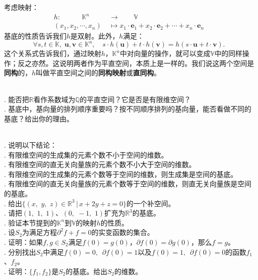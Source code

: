 \documentclass[12pt,UTF8]{ctexbook}
\begin{document}
考虑映射：
\begin{align*}
    h:\quad \qquad \mathbb{K}^n\qquad &\rightarrow \qquad \mathbb{V} \\
    (x_1, x_2, \cdots , x_n) &\mapsto x_1\cdot \mathbf{e}_1 + x_2\cdot \mathbf{e}_2 + \cdots + x_n\cdot \mathbf{e}_n
\end{align*}
基底的性质告诉我们$h$是双射。此外，$h$满足：
$$ \forall s, t \in \mathbb{K}, \; \mathbf{u}, \mathbf{v}\in \mathbb{K}^n, \quad s\cdot h(\mathbf{u}) + t\cdot h(\mathbf{v}) = h(s\cdot \mathbf{u} + t\cdot \mathbf{v}). $$
这个关系式告诉我们，通过映射$h$，$\mathbb{K}^n$中对向量的操作，就可以变成$\mathbb{V}$中的同样操作；反之亦然。这说明两者作为平直空间，本质上是一样的。我们说这两个空间是\textbf{同构}的，$h$叫做平直空间之间的\textbf{同构映射}或\textbf{直同构}。

\begin{sk}
    \mbox{} \\
    . 能否把$\mathbb{R}$看作系数域为$\mathbb{Q}$的平直空间？它是否是有限维空间？\\
    . 基底中，基向量的排列顺序重要吗？按不同顺序排列的基向量，能否看做不同的基底？给出你的理由。
\end{sk}

\begin{xt}
    \mbox{} \\
    . 说明以下结论：\\
    . 有限维空间的生成集的元素个数不小于空间的维数。\\
    . 有限维空间的直无关向量族的元素个数不小大于空间的维数。\\
    . 有限维空间的生成集的元素个数等于空间的维数，则生成集是空间的基底。\\
    . 有限维空间的直无关向量族的元素个数等于空间的维数，则直无关向量族是空间的基底。\\
    . 给出$\{(x,\,\,y,\,\,z)\in\mathbb{R}^3 \, | \, x + 2y + z = 0 \}$的一个补空间。\\
    . 请把$(1,\,\,1, \,\,1)$、$(0,\,\, -1, \,\,1)$扩充为$\mathbb{R}^3$的基底。\\
    . 验证本节提到的$\mathbb{K}^n$到$\mathbb{V}$的映射$h$的性质。\\
    . 设$S_2$为满足方程$\partial^2 f + f = 0$的实变函数的集合。\\
    . 证明：如果$f,g\in S_2$满足$f(0) = g(0)$，$\partial f(0) = \partial g(0)$，那么$f = g$。\\
    . 分别找出$S_2$中满足$f(0) = 0, \,\,\, \partial f(0) = 1$以及$f(0) = 1, \,\,\, \partial f(0) = 0$的函数$f_1$、$f_2$。\\
    . 证明：$\{f_1, f_2\}$是$S_2$的基底。给出$S_2$的维数。
\end{xt}
\end{document}
